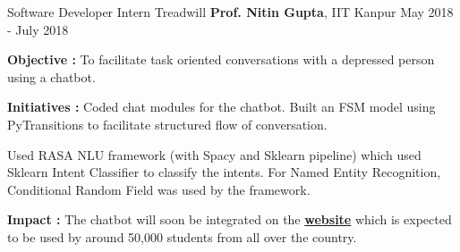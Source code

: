\begin{cventries}
  \cventry
    {Software Developer Intern}
    {Treadwill}
    {\textbf{Prof. Nitin Gupta}, IIT Kanpur}
    {May 2018 - July 2018}
    {
      \begin{cvitems}
        \item {\textbf{Objective : }To facilitate task oriented conversations with a depressed person using a chatbot.}
        \item {\textbf{Initiatives : }Coded chat modules for the chatbot. Built an FSM model using PyTransitions to facilitate structured flow of conversation.}
        \item {Used RASA NLU framework (with Spacy and Sklearn pipeline) which used Sklearn Intent Classifier to classify the intents. For Named Entity Recognition, Conditional Random Field was used by the framework.}
        \item {\textbf{Impact : }The chatbot will soon be integrated on the \href{www.treadwill.org}{\textbf{website}} which is expected to be used by around 50,000 students from all over the country.}
      \end{cvitems}
    }
\end{cventries}
